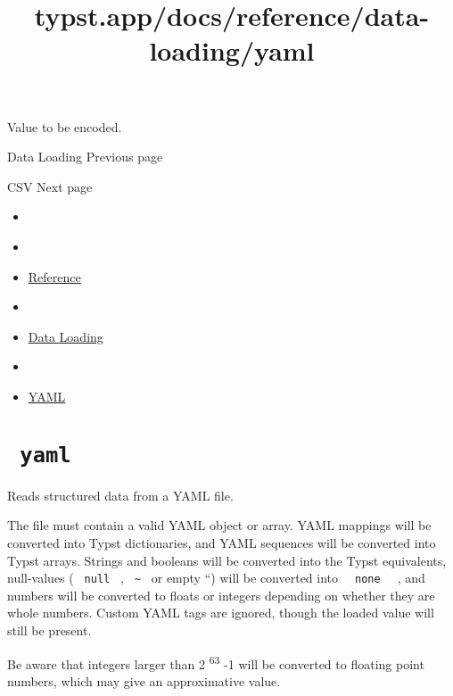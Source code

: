 Value to be encoded.

\href{/docs/reference/data-loading/}{\pandocbounded{}}

{ Data Loading } { Previous page }

\href{/docs/reference/data-loading/csv/}{\pandocbounded{}}

{ CSV } { Next page }


\title{typst.app/docs/reference/data-loading/yaml}

\begin{itemize}
\tightlist
\item
  \href{/docs}{}
\item
  
\item
  \href{/docs/reference/}{Reference}
\item
  
\item
  \href{/docs/reference/data-loading/}{Data Loading}
\item
  
\item
  \href{/docs/reference/data-loading/yaml/}{YAML}
\end{itemize}

\section{\texorpdfstring{\texttt{\ yaml\ }}{ yaml }}\label{summary}

Reads structured data from a YAML file.

The file must contain a valid YAML object or array. YAML mappings will
be converted into Typst dictionaries, and YAML sequences will be
converted into Typst arrays. Strings and booleans will be converted into
the Typst equivalents, null-values ( \texttt{\ null\ } ,
\texttt{\ \textasciitilde{}\ } or empty ``) will be converted into
\texttt{\ }{\texttt{\ none\ }}\texttt{\ } , and numbers will be
converted to floats or integers depending on whether they are whole
numbers. Custom YAML tags are ignored, though the loaded value will
still be present.

Be aware that integers larger than 2 \textsuperscript{63} -1 will be
converted to floating point numbers, which may give an approximative
value.


